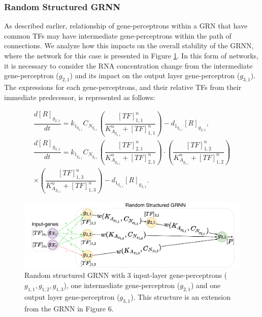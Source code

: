 \documentclass[twocolumn]{biophys-new}
\begin{document}
{{\subsubsection*{Random Structured GRNN}
As described earlier, relationship of gene-perceptrons within a GRN that have common TFs may have intermediate gene-perceptrons within the path of connections. We analyze how this impacts on the overall stability of the GRNN, where the network for this case is presented in Figure \ref{inter_node_1}. In this form of networks, it is necessary to consider the RNA concentration change from the intermediate gene-perceptron ($g_{2,1}$) and its impact on the output layer gene-perceptron ($g_{3,1}$). The expressions for each gene-perceptrons, and their relative TFs from their immediate predecessor, is represented as follows: 



\vspace{-1em}
\begin{gather}
  \dfrac{d[R]_{g_{2,1}}}{dt} = k_{1_{g_{2,1}}} C_{N_{g_{2,1}}}  \left( \dfrac{[TF]_{1,1}^n}{K_{A_{g_{2,1}}}^n+ [TF]_{1,1}^n} \right) 
    - d_{ 1_{g_{2,1}}} [R]_{g_{2,1}}, \label{eq:inter_node} \\
    \dfrac{d[R]_{g_{3,1}}}{dt} = k_{1_{g_{3,1}}} C_{N_{g_{3,1}}}  \left( \dfrac{[TF]_{2,1}^n}{K_{A_{g_{3,1}}}^n+ [TF]_{2,1}^n} \right) 
    \cdot  \left( \dfrac{[TF]_{1,2}^n}{K_{A_{g_{3,1}}}^n+ [TF]_{1,2}^n} \right) \nonumber \\ \times \left( \dfrac{[TF]_{1,3}^n}{K_{A_{g_{3,1}}}^n+ [TF]_{1,3}^n} \right) - d_{ 1_{g_{3,1}} } [R]_{g_{3,1}}. \label{eq:inter_node_g31}
\end{gather}


\begin{figure}[ht!] %
\centering
\includegraphics[width=\columnwidth]{figures/intermediate_node-1.pdf}
\caption{Random structured GRNN with 3 input-layer gene-perceptrons ($g_{1,1}, g_{1,2}, g_{1,3}$), one intermediate gene-perceptron ($g_{2,1}$) and one output layer gene-perceptron ($g_{3,1}$). This structure is an extension from the GRNN in Figure 6. \vspace{0.5em}}
\label{inter_node_1}
\vspace{-0.5em}
\end{figure}

}}
\end{document}

